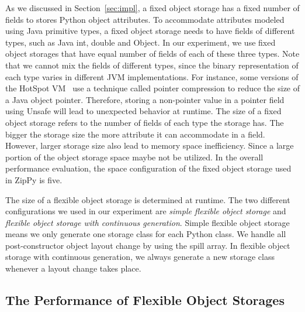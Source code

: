 As we discussed in Section~\ref{sec:impl}, a fixed object storage has a fixed number of fields to stores Python object attributes.
To accommodate attributes modeled using Java primitive types, a fixed object storage needs to have fields of different types, such as Java \textsf{int}, \textsf{double} and \textsf{Object}.
In our experiment, we use fixed object storages that have equal number of fields of each of these three types.
Note that we cannot mix the fields of different types, since the binary representation of each type varies in different JVM implementations.
For instance, some versions of the HotSpot VM~\cite{hotspot} use a technique called pointer compression to reduce the size of a Java object pointer.
Therefore, storing a non-pointer value in a pointer field using \textsf{Unsafe} will lead to unexpected behavior at runtime.
The size of a fixed object storage refers to the number of fields of each type the storage has.
The bigger the storage size the more attribute it can accommodate in a field.
However, larger storage size also lead to memory space inefficiency.
Since a large portion of the object storage space maybe not be utilized.
In the overall performance evaluation, the space configuration of the fixed object storage used in ZipPy is five.

The size of a flexible object storage is determined at runtime.
The two different configurations we used in our experiment are \emph{simple flexible object storage} and \emph{flexible object storage with continuous generation}.
Simple flexible object storage means we only generate one storage class for each Python class.
We handle all post-constructor object layout change by using the spill array.
In flexible object storage with continuous generation, we always generate a new storage class whenever a layout change takes place.

\subsection{The Performance of Flexible Object Storages}

